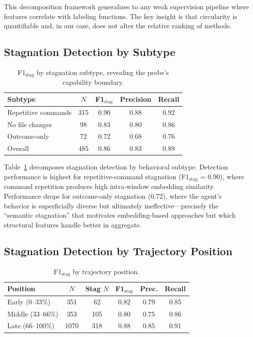 \documentclass[11pt,a4paper]{article}
\begin{document}
This decomposition framework generalizes to any weak supervision pipeline where features correlate with labeling functions.
The key insight is that circularity is quantifiable and, in our case, does not alter the relative ranking of methods.

\subsection{Stagnation Detection by Subtype}

\begin{table}[t]
\centering
\small
\begin{tabular}{lcccc}
\toprule
Subtype & $N$ & F1$_\text{stag}$ & Precision & Recall \\
\midrule
Repetitive commands & 315 & 0.90 & 0.88 & 0.92 \\
No file changes & 98 & 0.83 & 0.80 & 0.86 \\
Outcome-only & 72 & 0.72 & 0.68 & 0.76 \\
\midrule
Overall & 485 & 0.86 & 0.83 & 0.89 \\
\bottomrule
\end{tabular}
\caption{F1$_\text{stag}$ by stagnation subtype, revealing the probe's capability boundary.}
\label{tab:subtype}
\end{table}

Table~\ref{tab:subtype} decomposes stagnation detection by behavioral subtype.
Detection performance is highest for repetitive-command stagnation (F1$_\text{stag}$ = 0.90), where command repetition produces high intra-window embedding similarity.
Performance drops for outcome-only stagnation (0.72), where the agent's behavior is superficially diverse but ultimately ineffective---precisely the ``semantic stagnation'' that motivates embedding-based approaches but which structural features handle better in aggregate.

\subsection{Stagnation Detection by Trajectory Position}

\begin{table}[t]
\centering
\small
\begin{tabular}{lccccc}
\toprule
Position & $N$ & Stag $N$ & F1$_\text{stag}$ & Prec. & Recall \\
\midrule
Early (0--33\%) & 351 & 62 & 0.82 & 0.79 & 0.85 \\
Middle (33--66\%) & 353 & 105 & 0.80 & 0.75 & 0.86 \\
Late (66--100\%) & 1070 & 318 & 0.88 & 0.85 & 0.91 \\
\bottomrule
\end{tabular}
\caption{F1$_\text{stag}$ by trajectory position.}
\label{tab:position}
\end{table}
\end{document}
